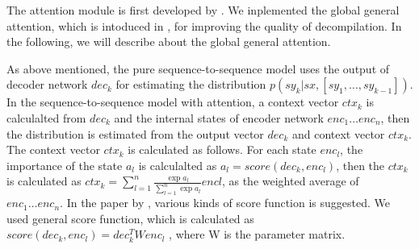 \documentclass[senior,final,11pt]{iscs-thesis}
\begin{document}
The attention module is first developed by \cite{attention_paper}.
We inplemented the global general attention, which is intoduced in \cite{dot_attention}, for improving the quality of decompilation.
In the following, we will describe about the global general attention.

As above mentioned, the pure sequence-to-sequence model uses the output of decoder network $ dec_{k} $ for estimating 
the distribution $ p(sy_k|sx,[sy_1,\dots,sy_{k-1}]) $.
In the sequence-to-sequence model with attention, 
a context vector $ ctx_{k} $ is calculalted from $ dec_{k} $ and the internal states of encoder network $ enc_{1} \dots enc_{n} $, 
then the distribution is estimated from the output vector $ dec_{k} $ and context vector $ ctx_{k} $.
The context vector $ ctx_{k} $ is calculated as follows.
For each state $ enc_{l} $, the importance of the state $ a_{l} $ is calculalted as $ a_{l} = score(dec_{k},enc_{l}) $,
then the $ ctx_{k} $ is calculated as $ ctx_{k} = \sum_{l=1}^{n} \frac{\exp{a_{l}}}{\sum_{l=1}^{n}\exp{a_{l}}} enc{l} $, as the weighted average of $ enc_{1} \dots enc_{n} $.
In the paper by \cite{dot_attention}, various kinds of score function is suggested.
We used general score function, which is calculated as $ score(dec_{k},enc_{l}) = dec_{k}^T W enc_{l} $ ,
where W is the parameter matrix. 






\end{document}
